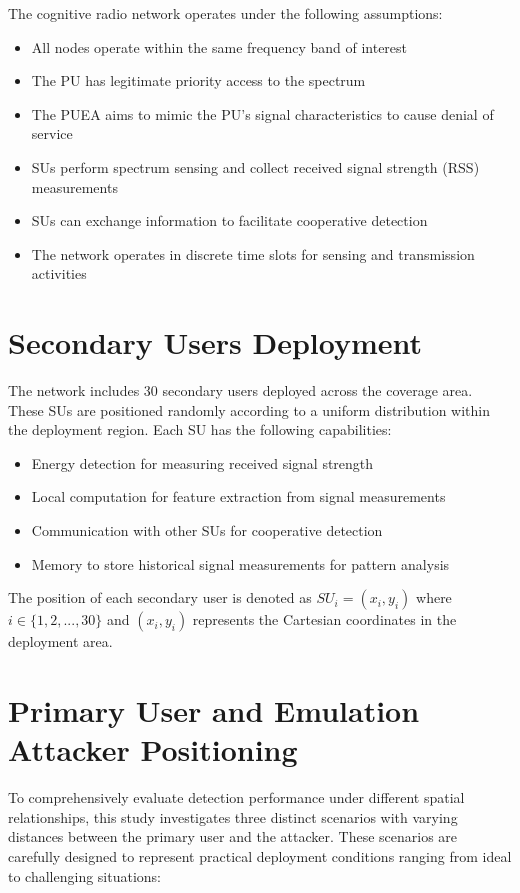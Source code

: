 The cognitive radio network operates under the following assumptions:

\begin{itemize}
    \item All nodes operate within the same frequency band of interest
    \item The PU has legitimate priority access to the spectrum
    \item The PUEA aims to mimic the PU's signal characteristics to cause denial of service
    \item SUs perform spectrum sensing and collect received signal strength (RSS) measurements
    \item SUs can exchange information to facilitate cooperative detection
    \item The network operates in discrete time slots for sensing and transmission activities
\end{itemize}

\section{Secondary Users Deployment}

The network includes 30 secondary users deployed across the coverage area. These SUs are positioned randomly according to a uniform distribution within the deployment region. Each SU has the following capabilities:

\begin{itemize}
    \item Energy detection for measuring received signal strength
    \item Local computation for feature extraction from signal measurements
    \item Communication with other SUs for cooperative detection
    \item Memory to store historical signal measurements for pattern analysis
\end{itemize}

The position of each secondary user is denoted as $SU_i = (x_i, y_i)$ where $i \in \{1, 2, ..., 30\}$ and $(x_i, y_i)$ represents the Cartesian coordinates in the deployment area.

\section{Primary User and Emulation Attacker Positioning}

To comprehensively evaluate detection performance under different spatial relationships, this study investigates three distinct scenarios with varying distances between the primary user and the attacker. These scenarios are carefully designed to represent practical deployment conditions ranging from ideal to challenging situations:

